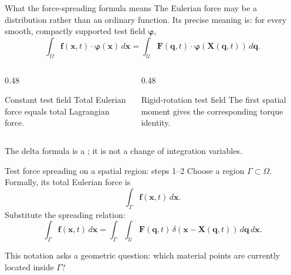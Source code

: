 \documentclass[aspectratio=169,11pt]{beamer}
\newcommand{\xvec}{\bm{x}}
\newcommand{\Xvec}{\bm{q}}
\newcommand{\chivec}{\bm{X}}
\newcommand{\fvec}{\bm{f}}
\newcommand{\Fvec}{\bm{F}}
\newcommand{\testvec}{\bm{\varphi}}
\begin{document}
\begin{frame}{What the force-spreading formula means}
The Eulerian force may be a distribution rather than an ordinary function. Its precise meaning is: for every smooth, compactly supported test field \(\testvec\),
\[
  \boxed{
  \int_{\Omega}
  \fvec(\xvec,t)\cdot\testvec(\xvec)\,d\xvec
  =
  \int_{\mathcal U}
  \Fvec(\Xvec,t)\cdot
  \testvec\!\left(\chivec(\Xvec,t)\right)\,d\Xvec .}
\]

\begin{columns}[T,onlytextwidth]
  \begin{column}{0.48\textwidth}
  \begin{block}{Constant test field}
    Total Eulerian force equals total Lagrangian force.
  \end{block}
  \end{column}
  \begin{column}{0.48\textwidth}
  \begin{block}{Rigid-rotation test field}
    The first spatial moment gives the corresponding torque identity.
  \end{block}
  \end{column}
\end{columns}

\begin{punchbox}
The delta formula is a ; it is not a change of integration variables.
\end{punchbox}
\end{frame}

\begin{frame}{Test force spreading on a spatial region: steps 1--2}
Choose a region \(\Gamma\subset\Omega\). Formally, its total Eulerian force is
\[
  \int_{\Gamma}\fvec(\xvec,t)\,d\xvec .
\]
Substitute the spreading relation:
\[
  \int_{\Gamma}\fvec(\xvec,t)\,d\xvec
  =
  \int_{\Gamma}\int_{\mathcal U}
  \Fvec(\Xvec,t)\,
  \delta\!\left(\xvec-\chivec(\Xvec,t)\right)
  \,d\Xvec\,d\xvec .
\]

\begin{punchbox}
This notation asks a geometric question: which material points are currently located inside \(\Gamma\)?
\end{punchbox}
\end{frame}
\end{document}
